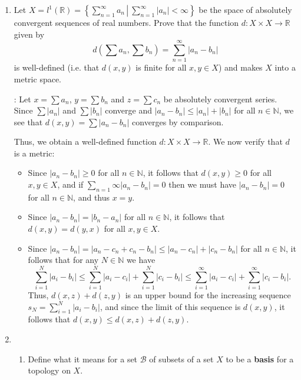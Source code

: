 \documentclass[12pt]{article}
\newcommand{\points}[1]{\marginpar{\hspace{24pt}[#1]}}
\newcommand{\di}{\displaystyle}
\newcommand{\R}{\mathbb{R}}
\newcommand{\N}{\mathbb{N}}
\newcommand{\abs}[1]{\lvert #1\rvert}
\begin{document}
\begin{enumerate}
\begin{enumerate}
\bigskip

\end{enumerate}
\newpage

\item Let $X=\displaystyle l^1(\mathbb{R}) = \left\{\sum_{n=1}^\infty a_n \,\left|\: \sum_{n=1}^\infty\abs{a_n}<\infty\right.\right\}$ be the space of absolutely convergent sequences of real numbers. Prove that the function $d:X\times X\to\R$ given by \points{8}
\[
d\left(\sum a_n, \sum b_n\right) = \sum_{n=1}^\infty\abs{a_n-b_n}
\]
is well-defined (i.e. that $d(x,y)$ is finite for all $x,y\in X$) and makes $X$ into a metric space.

\bigskip

: Let $x=\sum a_n$, $y=\sum b_n$ and $z=\sum c_n$ be absolutely convergent series. Since $\sum\abs{a_n}$ and $\sum\abs{b_n}$ converge and $\abs{a_n-b_n}\leq \abs{a_n}+\abs{b_n}$ for all $n\in \N$, we see that $d(x,y)=\sum\abs{a_n-b_n}$ converges by comparison.

Thus, we obtain a well-defined function $d:X\times X\to\R$. We now verify that $d$ is a metric:
\begin{itemize}
 \item Since $\abs{a_n-b_n}\geq 0$ for all $n\in \N$, it follows that $d(x,y)\geq 0$ for all $x,y\in X$, and if $\di\sum_{n=1}\infty\abs{a_n-b_n}=0$ then we must have $\abs{a_n-b_n}=0$ for all $n\in\N$, and thus $x=y$.
 \item Since $\abs{a_n-b_n} = \abs{b_n-a_n}$ for all $n\in\N$, it follows that $d(x,y)=d(y,x)$ for all $x,y\in X$.
 \item Since $\abs{a_n-b_n} = \abs{a_n-c_n+c_n-b_n} \leq \abs{a_n-c_n}+\abs{c_n-b_n}$ for all $n\in \N$, it follows that for any $N\in \N$ we have
\[
 \sum_{i=1}^N\abs{a_i-b_i}\leq \sum_{i=1}^N\abs{a_i-c_i}+\sum_{i=1}^N\abs{c_i-b_i} \leq \sum_{i=1}^\infty\abs{a_i-c_i}+\sum_{i=1}^\infty\abs{c_i-b_i}.
\]
Thus, $d(x,z)+d(z,y)$ is an upper bound for the increasing sequence $s_N = \sum_{i=1}^N\abs{a_i-b_i}$, and since the limit of this sequence is $d(x,y)$, it follows that $d(x,y)\leq d(x,z)+d(z,y)$.
\end{itemize}


\bigskip

\newpage

\item \begin{enumerate}
\item Define what it means for a set $\mathcal{B}$ of subsets of a set $X$ to be a {\bf basis} for a topology on $X$. \points{3}


\end{enumerate}
\end{enumerate}
\end{document}

